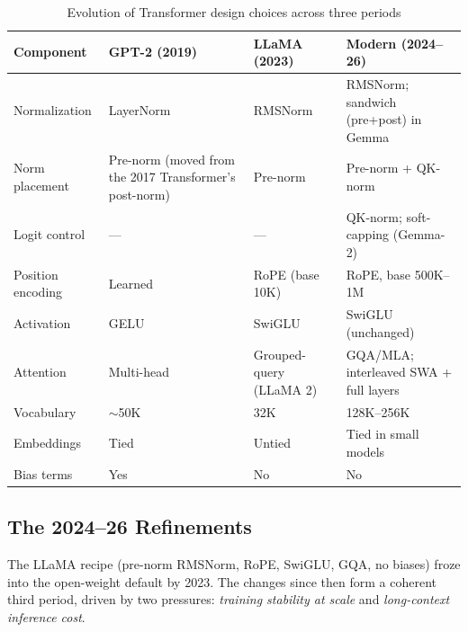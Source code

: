 \begin{table}[H]
\centering
\caption{Evolution of Transformer design choices across three periods}
\begin{tabularx}{\textwidth}{lXXX}
\toprule
\textbf{Component} & \textbf{GPT-2 (2019)} & \textbf{LLaMA (2023)} & \textbf{Modern (2024--26)} \\
\midrule
Normalization & LayerNorm & RMSNorm & RMSNorm; sandwich (pre+post) in Gemma \\
Norm placement & Pre-norm (moved from the 2017 Transformer's post-norm) & Pre-norm & Pre-norm + QK-norm \\
Logit control & --- & --- & QK-norm; soft-capping (Gemma-2) \\
Position encoding & Learned & RoPE (base 10K) & RoPE, base 500K--1M \\
Activation & GELU & SwiGLU & SwiGLU (unchanged) \\
Attention & Multi-head & Grouped-query (LLaMA 2) & GQA/MLA; interleaved SWA + full layers \\
Vocabulary & $\sim$50K & 32K & 128K--256K \\
Embeddings & Tied & Untied & Tied in small models \\
Bias terms & Yes & No & No \\
\bottomrule
\end{tabularx}
\end{table}

\subsection{The 2024--26 Refinements}
\label{sec:modern_2024_26}

The LLaMA recipe (pre-norm RMSNorm, RoPE, SwiGLU, GQA, no biases) froze into the open-weight default by 2023. The changes since then form a coherent third period, driven by two pressures: \textit{training stability at scale} and \textit{long-context inference cost}.


